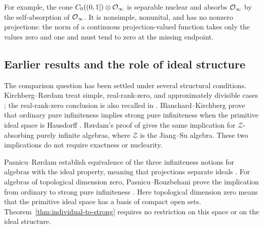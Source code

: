 For example, the cone \(C_0((0,1])\otimes\mathcal O_\infty\) is separable
nuclear and absorbs \(\mathcal O_\infty\) by the self-absorption of \(\mathcal O_\infty\).
It is nonsimple, nonunital, and has no nonzero projections: the norm
of a continuous projection-valued function takes only the values
zero and one and must tend to zero at the missing endpoint.

\subsection{Earlier results and the role of ideal structure}

The comparison question has been settled under several structural
conditions.  Kirchberg--R{\o}rdam treat simple, real-rank-zero, and
approximately divisible cases \cite{KR2002}; the real-rank-zero
conclusion is also recalled in \cite[Section~21]{STW99problems}.
Blanchard--Kirchberg prove that ordinary pure infiniteness implies
strong pure infiniteness when the primitive ideal space is Hausdorff
\cite[Theorem~5.8]{BlanchardKirchberg2004}.  R{\o}rdam's proof of
\cite[Theorem~5.2]{Rordam2004Z} gives the same implication for
\(\mathcal Z\)-absorbing purely infinite algebras, where
\(\mathcal Z\) is the Jiang--Su algebra.  These two implications do
not require exactness or nuclearity.

Pasnicu--R{\o}rdam establish equivalence of the three infiniteness
notions for algebras with the ideal property, meaning that projections
separate ideals \cite[Proposition~2.14]{PasnicuRordam2007}.
For algebras of topological dimension zero, Pasnicu--Rouzbehani prove
the implication from ordinary to strong pure infiniteness
\cite[Theorems~3.10(i) and~3.13]{PasnicuRouzbehani2025}.
Here topological dimension zero means that the primitive ideal space
has a basis of compact open sets.  Theorem~\ref{thm:individual-to-strong}
requires no restriction on this space or on the ideal structure.

